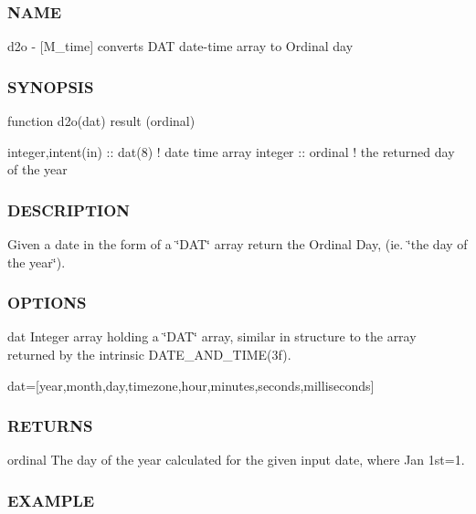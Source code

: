 \subsubsection*{N\+A\+ME}

d2o -\/ \mbox{[}M\+\_\+time\mbox{]} converts D\+AT date-\/time array to Ordinal day 

\subsubsection*{S\+Y\+N\+O\+P\+S\+IS}

\begin{DoxyVerb}function d2o(dat) result (ordinal)

 integer,intent(in) :: dat(8)   ! date time array
 integer            :: ordinal  ! the returned day of the year
\end{DoxyVerb}


\subsubsection*{D\+E\+S\+C\+R\+I\+P\+T\+I\+ON}

Given a date in the form of a \char`\"{}\+D\+A\+T\char`\"{} array return the Ordinal Day, (ie. \char`\"{}the day of the year\char`\"{}).

\subsubsection*{O\+P\+T\+I\+O\+NS}

dat Integer array holding a \char`\"{}\+D\+A\+T\char`\"{} array, similar in structure to the array returned by the intrinsic D\+A\+T\+E\+\_\+\+A\+N\+D\+\_\+\+T\+I\+M\+E(3f).

dat=\mbox{[}year,month,day,timezone,hour,minutes,seconds,milliseconds\mbox{]} \subsubsection*{R\+E\+T\+U\+R\+NS}

ordinal The day of the year calculated for the given input date, where Jan 1st=1.

\subsubsection*{E\+X\+A\+M\+P\+LE}

